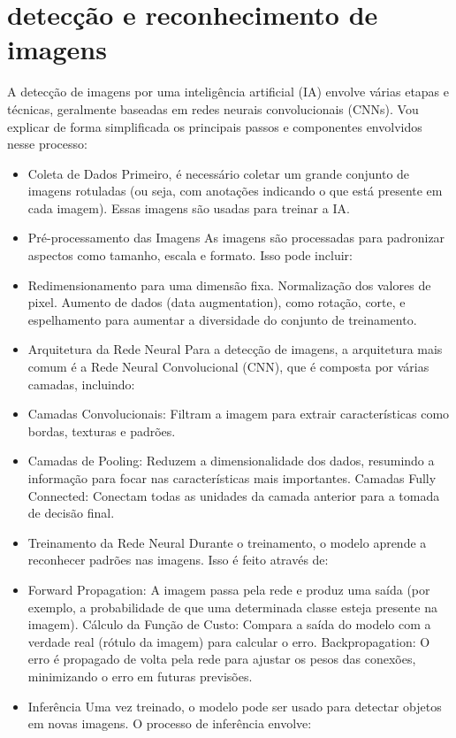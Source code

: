 \documentclass[a4paper,12pt]{article} %
\begin{document}
\section{detecção e reconhecimento de imagens}
A detecção de imagens por uma inteligência artificial (IA) envolve várias etapas e técnicas, geralmente baseadas em redes neurais convolucionais (CNNs). Vou explicar de forma simplificada os principais passos e componentes envolvidos nesse processo:
\begin{itemize}
\item  Coleta de Dados
Primeiro, é necessário coletar um grande conjunto de imagens rotuladas (ou seja, com anotações indicando o que está presente em cada imagem). Essas imagens são usadas para treinar a IA.

\item Pré-processamento das Imagens
As imagens são processadas para padronizar aspectos como tamanho, escala e formato. Isso pode incluir:

\item Redimensionamento para uma dimensão fixa.
Normalização dos valores de pixel.
Aumento de dados (data augmentation), como rotação, corte, e espelhamento para aumentar a diversidade do conjunto de treinamento.
\item  Arquitetura da Rede Neural
Para a detecção de imagens, a arquitetura mais comum é a Rede Neural Convolucional (CNN), que é composta por várias camadas, incluindo:

\item Camadas Convolucionais: Filtram a imagem para extrair características como bordas, texturas e padrões.
\item Camadas de Pooling: Reduzem a dimensionalidade dos dados, resumindo a informação para focar nas características mais importantes.
Camadas Fully Connected: Conectam todas as unidades da camada anterior para a tomada de decisão final.
\item  Treinamento da Rede Neural
Durante o treinamento, o modelo aprende a reconhecer padrões nas imagens. Isso é feito através de:

\item Forward Propagation: A imagem passa pela rede e produz uma saída (por exemplo, a probabilidade de que uma determinada classe esteja presente na imagem).
Cálculo da Função de Custo: Compara a saída do modelo com a verdade real (rótulo da imagem) para calcular o erro.
Backpropagation: O erro é propagado de volta pela rede para ajustar os pesos das conexões, minimizando o erro em futuras previsões.
\item Inferência
Uma vez treinado, o modelo pode ser usado para detectar objetos em novas imagens. O processo de inferência envolve:


\end{itemize}
\end{document}
